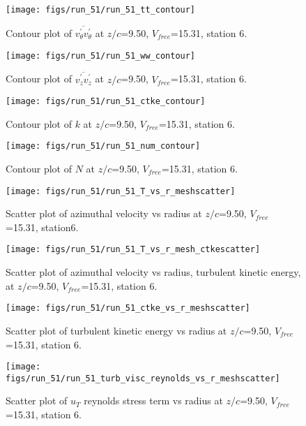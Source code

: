 \begin{figure}[H]
\centering
\texttt{[image: figs/run\_51/run\_51\_tt\_contour]}
\caption{Contour plot of $\overline{v_{\theta}^{\prime} v_{\theta}^{\prime}}$ at $z/c$=9.50, $V_{free}$=15.31, station 6.}
\end{figure}


\begin{figure}[H]
\centering
\texttt{[image: figs/run\_51/run\_51\_ww\_contour]}
\caption{Contour plot of $\overline{v_{z}^{\prime} v_{z}^{\prime}}$ at $z/c$=9.50, $V_{free}$=15.31, station 6.}
\end{figure}


\begin{figure}[H]
\centering
\texttt{[image: figs/run\_51/run\_51\_ctke\_contour]}
\caption{Contour plot of $k$ at $z/c$=9.50, $V_{free}$=15.31, station 6.}
\end{figure}


\begin{figure}[H]
\centering
\texttt{[image: figs/run\_51/run\_51\_num\_contour]}
\caption{Contour plot of $N$ at $z/c$=9.50, $V_{free}$=15.31, station 6.}
\end{figure}


\begin{figure}[H]
\centering
\texttt{[image: figs/run\_51/run\_51\_T\_vs\_r\_meshscatter]}
\caption{Scatter plot of azimuthal velocity vs radius at $z/c$=9.50, $V_{free}$=15.31, station6.}
\end{figure}


\begin{figure}[H]
\centering
\texttt{[image: figs/run\_51/run\_51\_T\_vs\_r\_mesh\_ctkescatter]}
\caption{Scatter plot of azimuthal velocity vs radius, turbulent kinetic energy, at $z/c$=9.50, $V_{free}$=15.31, station 6.}
\end{figure}


\begin{figure}[H]
\centering
\texttt{[image: figs/run\_51/run\_51\_ctke\_vs\_r\_meshscatter]}
\caption{Scatter plot of turbulent kinetic energy vs radius at $z/c$=9.50, $V_{free}$=15.31, station 6.}
\end{figure}


\begin{figure}[H]
\centering
\texttt{[image: figs/run\_51/run\_51\_turb\_visc\_reynolds\_vs\_r\_meshscatter]}
\caption{Scatter plot of $
u_T$ reynolds stress term vs radius at $z/c$=9.50, $V_{free}$=15.31, station 6.}
\end{figure}


